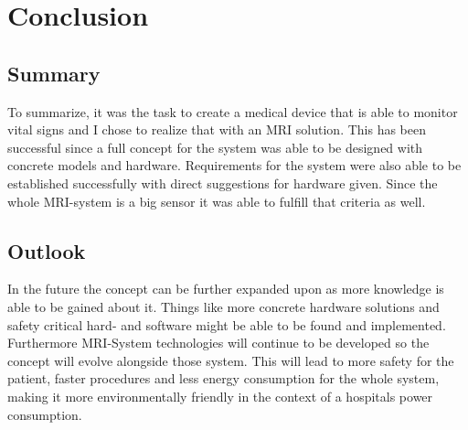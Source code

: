 \documentclass[conference]{IEEEtran}
\begin{document}
\section{Conclusion}

    \subsection{Summary}
    
    To summarize, it was the task to create a medical device that is able to monitor vital signs and I chose to realize that with an MRI solution. This has been successful since a full concept for the system was able to be designed with concrete models and hardware. Requirements for the system were also able to be established successfully with direct suggestions for hardware given. Since the whole MRI-system is a big sensor it was able to fulfill that criteria as well.    
    
    \subsection{Outlook}
    
    In the future the concept can be further expanded upon as more knowledge is able to be gained about it. Things like more concrete hardware solutions and safety critical hard- and software might be able to be found and implemented. Furthermore MRI-System technologies will continue to be developed so the concept will evolve alongside those system. This will lead to more safety for the patient, faster procedures and less energy consumption for the whole system, making it more environmentally friendly in the context of a hospitals power consumption.



\clearpage
\onecolumn
\appendix
\end{document}
